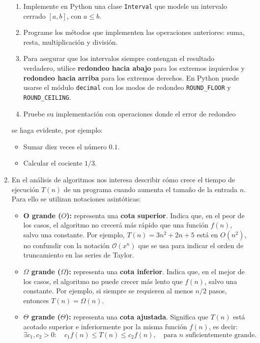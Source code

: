 \documentclass[12pt]{article}
\begin{document}
\begin{enumerate}[label=\textbf{\arabic*.}]
\begin{enumerate}[label=\alph*)]
\item Implemente en Python una clase \texttt{Interval} que modele un intervalo cerrado $[a,b]$, con $a \leq b$.  
\item Programe los métodos que implementen las operaciones anteriores: suma, resta, multiplicación y división.  
\item Para asegurar que los intervalos siempre contengan el resultado verdadero, utilice \textbf{redondeo hacia abajo} para los extremos izquierdos y \textbf{redondeo hacia arriba} para los extremos derechos. En Python puede usarse el módulo \texttt{decimal} con los modos de redondeo \texttt{ROUND\_FLOOR} y \texttt{ROUND\_CEILING}.  
\item Pruebe su implementación con operaciones donde el error de redondeo 
\end{enumerate}
se haga evidente, por ejemplo:
   \begin{itemize}
       \item Sumar diez veces el número $0.1$.  
       \item Calcular el cociente $1/3$.  
   \end{itemize}


\item 
En el análisis de algoritmos nos interesa describir cómo crece el tiempo de ejecución $T(n)$ de un programa cuando aumenta el tamaño de la entrada $n$. Para ello se utilizan notaciones asintóticas:

\begin{itemize}
    \item \textbf{O grande ($O$):} representa una \textbf{cota superior}. Indica que, en el peor de los casos, el algoritmo no crecerá más rápido que una función $f(n)$, salvo una constante. Por ejemplo, $T(n)=3n^2+2n+5$ está en $O(n^2)$, no confundir con la notación $\mathcal{O}(x^n)$ que se usa para indicar el orden de truncamiento en las series de Taylor.
    
    \item \textbf{$\Omega$ grande ($\Omega$):} representa una \textbf{cota inferior}. Indica que, en el mejor de los casos, el algoritmo no puede crecer más lento que $f(n)$, salvo una constante. Por ejemplo, si siempre se requieren al menos $n/2$ pasos, entonces $T(n)=\Omega(n)$.
    
    \item \textbf{$\Theta$ grande ($\Theta$):} representa una \textbf{cota ajustada}. Significa que $T(n)$ está acotado superior e inferiormente por la misma función $f(n)$, es decir:
    \[
        \exists c_1,c_2 > 0: \quad c_1 f(n) \leq T(n) \leq c_2 f(n), \quad \text{para $n$ suficientemente grande.}
    \]
\end{itemize}


\end{enumerate}
\end{document}

